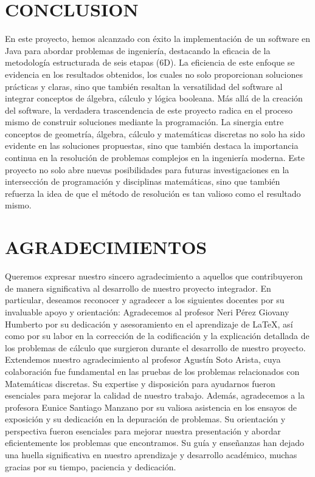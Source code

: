 \documentclass{IEEEcsmag}
\begin{document}
\section{CONCLUSION}
En este proyecto, hemos alcanzado con éxito la implementación de un software en Java para abordar problemas de ingeniería, destacando la eficacia de la metodología estructurada de seis etapas (6D). La eficiencia de este enfoque se evidencia en los resultados obtenidos, los cuales no solo proporcionan soluciones prácticas y claras, sino que también resaltan la versatilidad del software al integrar conceptos de álgebra, cálculo y lógica booleana. 
Más allá de la creación del software, la verdadera trascendencia de este proyecto radica en el proceso mismo de construir soluciones mediante la programación. La sinergia entre conceptos de geometría, álgebra, cálculo y matemáticas discretas no solo ha sido evidente en las soluciones propuestas, sino que también destaca la importancia continua en la resolución de problemas complejos en la ingeniería moderna. Este proyecto no solo abre nuevas posibilidades para futuras investigaciones en la intersección de programación y disciplinas matemáticas, sino que también refuerza la idea de que el método de resolución es tan valioso como el resultado mismo.
\vspace*{-8pt}


\section{AGRADECIMIENTOS}
Queremos expresar nuestro sincero agradecimiento a aquellos que contribuyeron de manera significativa al desarrollo de nuestro proyecto integrador. En particular, deseamos reconocer y agradecer a los siguientes docentes por su invaluable apoyo y orientación:
Agradecemos al profesor Neri Pérez Giovany Humberto por su dedicación y asesoramiento en el aprendizaje de LaTeX, así como por su labor en la corrección de la codificación y la explicación detallada de los problemas de cálculo que surgieron durante el desarrollo de nuestro proyecto.
Extendemos nuestro agradecimiento al profesor Agustín Soto Arista, cuya colaboración fue fundamental en las pruebas de los problemas relacionados con Matemáticas discretas. Su expertise y disposición para ayudarnos fueron esenciales para mejorar la calidad de nuestro trabajo.
Además, agradecemos a la profesora Eunice Santiago Manzano por su valiosa asistencia en los ensayos de exposición y su dedicación en la depuración de problemas. Su orientación y perspectiva fueron esenciales para mejorar nuestra presentación y abordar eficientemente los problemas que encontramos.
Su guía y enseñanzas han dejado una huella significativa en nuestro aprendizaje y desarrollo académico, muchas gracias por su tiempo, paciencia y dedicación.
\end{document}
